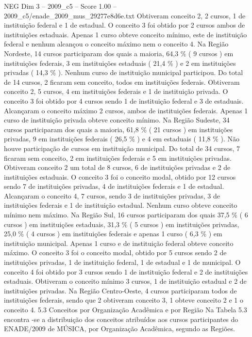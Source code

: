 \begin{textsample}{NEG Dim 3 – 2009\_c5 – Score 1.00 – 2009\_c5/enade\_2009\_mus\_29277e8d6e.txt}
Obtiveram conceito 2, 2 cursos, 1 de instituição federal e 1 de estadual.
O conceito 3 foi obtido por 2 cursos ambos de instituições estaduais.
Apenas 1 curso obteve conceito mínimo, este de instituição federal e nenhum alcançou o conceito máximo nem o conceito 4.
Na Região Nordeste, 14 cursos participaram dos quais a maioria, 64,3 \% ( 9 cursos ) em instituições federais, 3 em instituições estaduais ( 21,4 \% ) e 2 em instituições privadas ( 14,3 \% ).
Nenhum curso de instituição municipal participou.
Do total de 14 cursos, 2 ficaram sem conceito, todos em instituições federais.
Obtiveram conceito 2, 5 cursos, 4 em instituições federais e 1 de instituição privada.
O conceito 3 foi obtido por 4 cursos sendo 1 de instituição federal e 3 de estaduais.
Alcançaram o conceito máximo 2 cursos, ambos de instituições federais.
Apenas 1 curso de instituição privada obteve conceito mínimo.
Na Região Sudeste, 34 cursos participaram dos quais a maioria, 61,8 \% ( 21 cursos ) em instituições privadas, 9 em instituições federais ( 26,5 \% ) e 4 em estaduais ( 11,8 \% ).
Não houve participação de cursos em instituição municipal.
Do total de 34 cursos, 7 ficaram sem conceito, 2 em instituições federais e 5 em instituições privadas.
Obtiveram conceito 2 um total de 8 cursos, 6 de instituições privadas e 2 de instituições estaduais.
O conceito 3 foi o conceito modal, obtido por 12 cursos sendo 7 de instituições privadas, 4 de instituições federais e 1 de estadual.
Alcançaram o conceito 4, 7 cursos, sendo 3 de instituições privadas, 3 de instituições federais e 1 de instituição estadual.
Nenhum curso obteve conceito mínimo nem máximo.
Na Região Sul, 16 cursos participaram dos quais 37,5 \% ( 6 cursos ) em instituições estaduais, 31,3 \% ( 5 cursos ) em instituições privadas, 25,0 \% ( 4 cursos ) em instituições federais e apenas 1 curso ( 6,3 \% ) em instituição municipal.
Apenas 1 curso e de instituição federal obteve conceito máximo.
O conceito 3 foi o conceito modal, obtido por 5 cursos sendo 2 de instituições privadas, 1 de instituição federal, 1 de estadual e 1 de municipal.
O conceito 4 foi obtido por 3 cursos sendo 1 de instituição federal e 2 de instituições estaduais.
Obtiveram o conceito mínimo 3 cursos, 1 de instituição estadual e 2 de instituições privadas.
Na Região Centro-Oeste, 4 cursos participaram todos de instituições federais, sendo que 2 obtiveram conceito 3, 1 obteve conceito 2 e 1 o conceito 4. 5.3 Conceitos por Organização Acadêmica e por Região Na Tabela 5.3 encontra -se a distribuição dos conceitos atribuídos aos cursos participantes do ENADE/2009 de MÚSICA, por Organização Acadêmica, segundo as Regiões.

\end{textsample}
